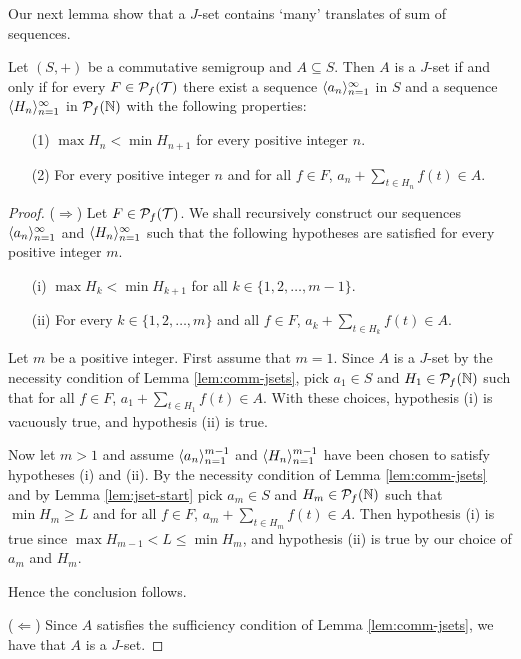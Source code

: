 Our next lemma show that a $J$-set contains `many' translates of sum of sequences. 
\begin{lem}
  \label{lem:comm-many}
  Let $(S, +)$ be a commutative semigroup and $A \subseteq S$.
  Then $A$ is a $J$-set if and only if for every $F \in \mathcal{P}_f(\mathcal{T})$ there exist a sequence $\langle a_n \rangle_{n=1}^\infty$ in $S$ and a sequence $\langle H_n \rangle_{n=1}^\infty$ in $\mathcal{P}_f(\mathbb{N})$ with the following properties:
  \begin{itemize}
    \item[(1)]
      $\max H_n < \min H_{n+1}$ for every positive integer $n$.

    \item[(2)]
      For every positive integer $n$ and for all $f \in F$, $a_n + \sum_{t \in H_n} f(t) \in A$. 
  \end{itemize}
\end{lem}
\begin{proof}
  ($\Rightarrow$)
  Let $F \in \mathcal{P}_f(\mathcal{T})$.
  We shall recursively construct our sequences $\langle a_n \rangle_{n=1}^\infty$ and $\langle H_n \rangle_{n=1}^\infty$ such that the following hypotheses are satisfied for every positive integer $m$. 
  \begin{itemize}
    \item[(i)]
      $\max H_k < \min H_{k+1}$ for all $k \in \{1, 2, \ldots, m-1\}$.

    \item[(ii)]
      For every $k \in \{1, 2, \ldots, m\}$ and all $f \in F$, $a_k + \sum_{t \in H_k} f(t) \in A$.
  \end{itemize}

  Let $m$ be a positive integer.
  First assume that $m = 1$. 
  Since $A$ is a $J$-set by the necessity condition of Lemma \ref{lem:comm-jsets}, pick $a_1 \in S$ and $H_1 \in \mathcal{P}_f(\mathbb{N})$ such that for all $f \in F$, $ a_1 + \sum_{t \in H_1} f(t)\in A$. 
  With these choices, hypothesis (i) is vacuously true, and hypothesis (ii) is true.

  Now let $m > 1$ and assume $\langle a_n \rangle_{n=1}^{m-1}$ and $\langle H_n \rangle_{n=1}^{m-1}$ have been chosen to satisfy hypotheses (i) and (ii).
  By the necessity condition of Lemma \ref{lem:comm-jsets} and by Lemma \ref{lem:jset-start} pick $a_m \in S$ and $H_m \in \mathcal{P}_f(\mathbb{N})$ such that $\min H_m \ge L$ and for all $f \in F$, $a_m + \sum_{t \in H_m} f(t) \in A$. 
  Then hypothesis (i) is true since $\max H_{m-1} < L \le \min H_m$, and hypothesis (ii) is true by our choice of $a_m$ and $H_m$. 

  Hence the conclusion follows.

  ($\Leftarrow$)
  Since $A$ satisfies the sufficiency condition of Lemma \ref{lem:comm-jsets}, we have that $A$ is a $J$-set.
\end{proof}

